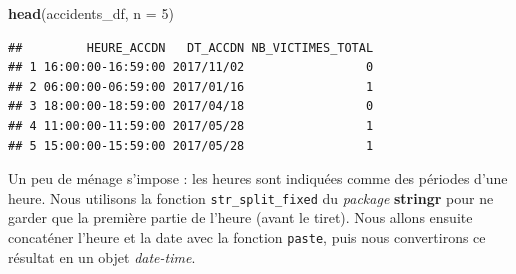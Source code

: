 \documentclass[
  11pt,
  french,
]{book}
\makeatletter
\newenvironment{Shaded}{\begin{snugshade}}{\end{snugshade}}
\newcommand{\CommentTok}[1]{\textcolor[rgb]{0.56,0.35,0.01}{\textit{#1}}}
\newcommand{\DataTypeTok}[1]{\textcolor[rgb]{0.13,0.29,0.53}{#1}}
\newcommand{\DecValTok}[1]{\textcolor[rgb]{0.00,0.00,0.81}{#1}}
\newcommand{\KeywordTok}[1]{\textcolor[rgb]{0.13,0.29,0.53}{\textbf{#1}}}
\newcommand{\NormalTok}[1]{#1}
\newcommand{\OperatorTok}[1]{\textcolor[rgb]{0.81,0.36,0.00}{\textbf{#1}}}
\newcommand{\StringTok}[1]{\textcolor[rgb]{0.31,0.60,0.02}{#1}}
\newenvironment{kframe}{%
\medskip{}
\setlength{\fboxsep}{.8em}
 \def\at@end@of@kframe{}%
 \ifinner\ifhmode%
  \def\at@end@of@kframe{\end{minipage}}%
  \begin{minipage}{\columnwidth}%
 \fi\fi%
 \def\FrameCommand##1{\hskip\@totalleftmargin \hskip-\fboxsep
 \colorbox{shadecolor}{##1}\hskip-\fboxsep
     \hskip-\linewidth \hskip-\@totalleftmargin \hskip\columnwidth}%
 \MakeFramed {\advance\hsize-\width
   \@totalleftmargin\z@ \linewidth\hsize
   \@setminipage}}%
 {\par\unskip\endMakeFramed%
 \at@end@of@kframe}
\renewenvironment{Shaded}{\begin{kframe}}{\end{kframe}}
\makeatother
\begin{document}
\begin{Shaded}
\begin{Highlighting}[]
\KeywordTok{head}\NormalTok{(accidents_df, }\DataTypeTok{n =} \DecValTok{5}\NormalTok{)}
\end{Highlighting}
\end{Shaded}

\begin{verbatim}
##         HEURE_ACCDN   DT_ACCDN NB_VICTIMES_TOTAL
## 1 16:00:00-16:59:00 2017/11/02                 0
## 2 06:00:00-06:59:00 2017/01/16                 1
## 3 18:00:00-18:59:00 2017/04/18                 0
## 4 11:00:00-11:59:00 2017/05/28                 1
## 5 15:00:00-15:59:00 2017/05/28                 1
\end{verbatim}

Un peu de ménage s'impose : les heures sont indiquées comme des périodes d'une heure. Nous utilisons la fonction \texttt{str\_split\_fixed} du \emph{package} \textbf{stringr} pour ne garder que la première partie de l'heure (avant le tiret). Nous allons ensuite concaténer l'heure et la date avec la fonction \texttt{paste}, puis nous convertirons ce résultat en un objet \emph{date-time}.

\begin{Shaded}
\end{Shaded}
\end{document}
